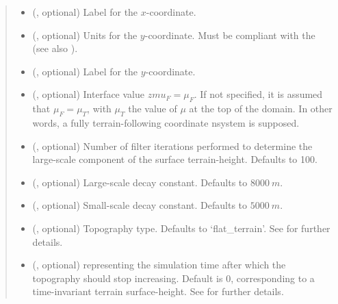 \documentclass[letterpaper,10pt,english]{sphinxmanual}
\begin{document}
\begin{fulllineitems}
\begin{fulllineitems}
\begin{quote}
\begin{description}
\begin{itemize}
\item {} 
 (, optional) \textendash{} Label for the \(x\)-coordinate.

\item {} 
 (, optional) \textendash{} 
Units for the \(y\)-coordinate. Must be compliant with the 
(see also {\hyperref[\detokenize{api:grids.axis.Axis.__init__}]{}}).


\item {} 
 (, optional) \textendash{} Label for the \(y\)-coordinate.

\item {} 
 (, optional) \textendash{} Interface value \(zmu_F = \mu_F\). If not specified, it is assumed that \(\mu_F = \mu_T\), with
\(\mu_T\) the value of \(\mu\) at the top of the domain. In other words, a fully terrain-following
coordinate nsystem is supposed.

\item {} 
 (, optional) \textendash{} Number of filter iterations performed to determine the large-scale component of the surface terrain-height.
Defaults to 100.

\item {} 
 (, optional) \textendash{} Large-scale decay constant. Defaults to \(8000 ~ m\).

\item {} 
 (, optional) \textendash{} Small-scale decay constant. Defaults to \(5000 ~ m\).

\item {} 
 (, optional) \textendash{} Topography type. Defaults to ‘flat\_terrain’. See {\hyperref[\detokenize{api:module-grids.topography}]{}} for further details.

\item {} 
 (, optional) \textendash{}  representing the simulation time after which the topography should stop
increasing. Default is 0, corresponding to a time-invariant terrain surface-height. See {\hyperref[\detokenize{api:module-grids.topography}]{}}
for further details.


\end{itemize}
\end{description}
\end{quote}
\end{fulllineitems}
\end{fulllineitems}
\end{document}
